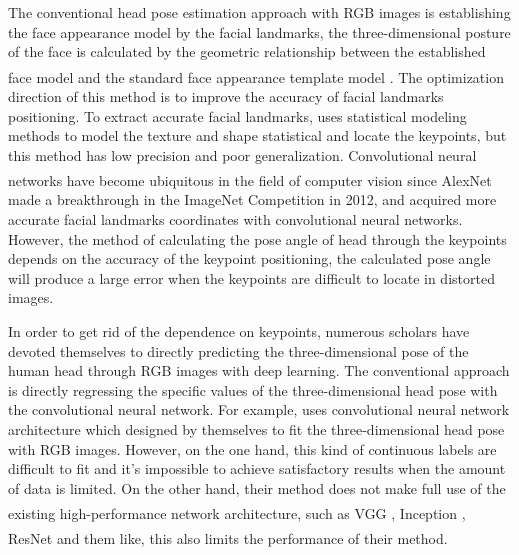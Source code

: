 \documentclass[english]{DDCLSconf}
\newcommand{\upcite}[1]{\textsuperscript{\textsuperscript{\cite{#1}}}}%
\begin{document}
The conventional head pose estimation approach with RGB images is establishing the face appearance model by the facial landmarks, the three-dimensional posture of the face is calculated by the geometric relationship between the established face model and the standard face appearance template model \upcite{AAM,keypoint,fan,dlib,video}. The optimization direction of this method is to improve the accuracy of facial landmarks positioning. To extract accurate facial landmarks, \cite{AAM} uses statistical modeling methods to model the texture and shape statistical and locate the keypoints, but this method has low precision and poor generalization. Convolutional neural networks have become ubiquitous in the field of computer vision since AlexNet \upcite{alexnet} made a breakthrough in the ImageNet Competition in 2012, and \cite{keypoint} acquired more accurate facial landmarks coordinates with convolutional neural networks. However, the method of calculating the pose angle of head through the keypoints depends on the accuracy of the keypoint positioning, the calculated pose angle will produce a large error when the keypoints are	difficult to locate in distorted images.

In order to get rid of the dependence on keypoints, numerous scholars have devoted themselves to directly predicting the three-dimensional pose of the human head through RGB images with deep learning. The conventional approach is directly regressing the specific values of the three-dimensional head pose with the convolutional neural network. For example, \cite{direct_regression} uses convolutional neural network architecture which designed by themselves to fit the three-dimensional head pose with RGB images. However, on the one hand, this kind of continuous labels are difficult to fit and it's impossible to achieve satisfactory results when the amount of data is limited. On the other hand, their method does not make full use of the existing high-performance network architecture, such as VGG \upcite{vgg}, Inception \upcite{inception}, ResNet \upcite{resnet} and them like, this also limits the performance of their method.
\end{document}
